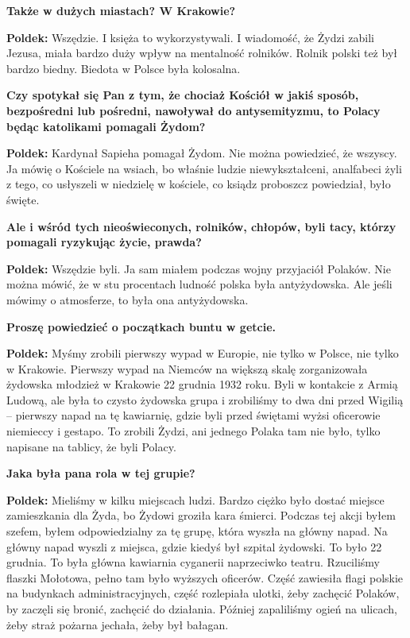 \begin{otherlanguage}{polish}
\textbf{Także w dużych miastach? W Krakowie?}

\textbf{Poldek:} Wszędzie. I księża to wykorzystywali. I wiadomość, że Żydzi zabili Jezusa, miała bardzo duży wpływ na mentalność rolników. Rolnik polski też był bardzo biedny. Biedota w Polsce była kolosalna.
 
\textbf{Czy spotykał się Pan z tym, że chociaż Kościół w jakiś sposób, bezpośredni lub pośredni, nawoływał do antysemityzmu, to Polacy będąc katolikami pomagali Żydom?}

\textbf{Poldek:} Kardynał Sapieha pomagał Żydom. Nie można powiedzieć, że wszyscy. Ja mówię o Kościele na wsiach, bo właśnie ludzie niewykształceni, analfabeci żyli z tego, co usłyszeli w niedzielę w kościele, co ksiądz proboszcz powiedział, było święte.

\textbf{Ale i wśród tych nieoświeconych, rolników, chłopów, byli tacy, którzy pomagali ryzykując życie, prawda?}

\textbf{Poldek:} Wszędzie byli. Ja sam miałem podczas wojny przyjaciół Polaków. Nie można mówić, że w stu procentach ludność polska była antyżydowska. Ale jeśli mówimy o atmosferze, to była ona antyżydowska.

\textbf{Proszę powiedzieć o początkach buntu w getcie.}
 
\textbf{Poldek:} Myśmy zrobili pierwszy wypad w Europie, nie tylko w Polsce, nie tylko w Krakowie. Pierwszy wypad na Niemców na większą skalę zorganizowała żydowska młodzież w Krakowie 22 grudnia 1932 roku. Byli w kontakcie z Armią Ludową, ale była to czysto żydowska grupa i zrobiliśmy to dwa dni przed Wigilią – pierwszy napad na tę kawiarnię, gdzie byli przed świętami wyżsi oficerowie niemieccy i gestapo. To zrobili Żydzi, ani jednego Polaka tam nie było, tylko napisane na tablicy, że byli Polacy.

\textbf{Jaka była pana rola w tej grupie?}

\textbf{Poldek:} Mieliśmy w kilku miejscach ludzi. Bardzo ciężko było dostać miejsce zamieszkania dla Żyda, bo Żydowi groziła kara śmierci. Podczas tej akcji byłem szefem, byłem odpowiedzialny za tę grupę, która wyszła na główny napad. Na główny napad wyszli z miejsca, gdzie kiedyś był szpital żydowski. To było 22 grudnia. To była główna kawiarnia cyganerii naprzeciwko teatru. Rzuciliśmy flaszki Mołotowa, pełno tam było wyższych oficerów. Część zawiesiła flagi polskie na budynkach administracyjnych, część rozlepiała ulotki, żeby zachęcić Polaków, by zaczęli się bronić, zachęcić do działania. Później zapaliliśmy ogień na ulicach, żeby straż pożarna jechała, żeby był bałagan.
 

\end{otherlanguage}
